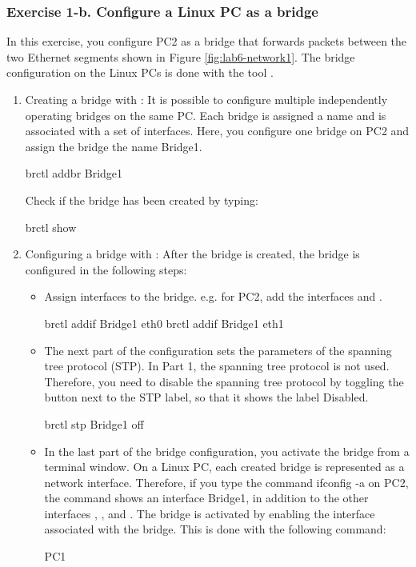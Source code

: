 \subsubsection{Exercise 1-b. Configure a Linux PC as a bridge}
In this exercise, you configure PC2 as a bridge that forwards packets between the two Ethernet segments shown in Figure \ref{fig:lab6-network1}. The bridge configuration on the Linux PCs is done with the tool .
\begin{enumerate}
	\item Creating a bridge with : It is possible to configure multiple independently operating bridges on the same PC. Each bridge is assigned a name and is associated with a set of interfaces. Here, you configure one bridge on PC2 and assign the bridge the name Bridge1.
		\begin{cmdblock}
	brctl addbr Bridge1	
		\end{cmdblock}
		Check if the bridge has been created by typing:
		\begin{cmdblock}
	brctl show
		\end{cmdblock}
	\item Configuring a bridge with : After the bridge is created, the bridge is configured in the following steps:
		\begin{itemize}
			\item Assign interfaces to the bridge. e.g. for PC2, add the interfaces  and .
				\begin{cmdblock}
	brctl addif Bridge1 eth0
	brctl addif Bridge1 eth1
				\end{cmdblock}
			\item The next part of the configuration sets the parameters of the spanning tree protocol (STP). In Part 1, the spanning tree protocol is not used. Therefore, you need to disable the spanning tree protocol by toggling the button next to the STP label, so that it shows the label Disabled.
				\begin{cmdblock}
	brctl stp Bridge1 off
				\end{cmdblock}
			\item In the last part of the bridge configuration, you activate the bridge  from a terminal window. On a Linux PC, each created bridge is represented as a network interface. Therefore, if you type the command ifconfig -a on PC2, the command shows an interface Bridge1, in addition to the other interfaces , , and . The bridge is activated by enabling the interface associated with the bridge. This is done with the following command:
				\begin{cmdblock}
	PC1%
			\end{cmdblock}
		\end{itemize}
\end{enumerate}

